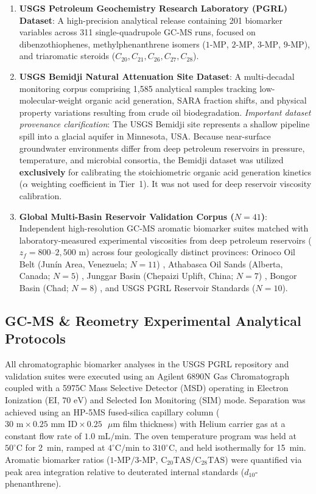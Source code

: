 \documentclass[review,12pt]{elsarticle}
\begin{document}
\begin{enumerate}
    \item \textbf{USGS Petroleum Geochemistry Research Laboratory (PGRL) Dataset}: A high-precision analytical release containing 201 biomarker variables across 311 single-quadrupole GC-MS runs, focused on dibenzothiophenes, methylphenanthrene isomers ($1\text{-MP}$, $2\text{-MP}$, $3\text{-MP}$, $9\text{-MP}$), and triaromatic steroids ($C_{20}, C_{21}, C_{26}, C_{27}, C_{28}$).
    \item \textbf{USGS Bemidji Natural Attenuation Site Dataset}: A multi-decadal monitoring corpus comprising 1,585 analytical samples tracking low-molecular-weight organic acid generation, SARA fraction shifts, and physical property variations resulting from crude oil biodegradation. \emph{Important dataset provenance clarification}: The USGS Bemidji site represents a shallow pipeline spill into a glacial aquifer in Minnesota, USA. Because near-surface groundwater environments differ from deep petroleum reservoirs in pressure, temperature, and microbial consortia, the Bemidji dataset was utilized \textbf{exclusively} for calibrating the stoichiometric organic acid generation kinetics ($\alpha$ weighting coefficient in Tier~1). It was not used for deep reservoir viscosity calibration.
    \item \textbf{Global Multi-Basin Reservoir Validation Corpus ($N=41$)}: Independent high-resolution GC-MS aromatic biomarker suites matched with laboratory-measured experimental viscosities from deep petroleum reservoirs ($z_f = 800\text{--}2{,}500\text{ m}$) across four geologically distinct provinces: Orinoco Oil Belt (Junín Area, Venezuela; $N=11$) \citep{lopez2014biodegradation}, Athabasca Oil Sands (Alberta, Canada; $N=5$) \citep{larter2012molecular}, Junggar Basin (Chepaizi Uplift, China; $N=7$) \citep{chang2022biodegradation}, Bongor Basin (Chad; $N=8$) \citep{mahmoodi2019biodegradation}, and USGS PGRL Reservoir Standards ($N=10$).
\end{enumerate}

\subsection{GC-MS \& Reometry Experimental Analytical Protocols}
All chromatographic biomarker analyses in the USGS PGRL repository and validation suites were executed using an Agilent 6890N Gas Chromatograph coupled with a 5975C Mass Selective Detector (MSD) operating in Electron Ionization (EI, $70\text{ eV}$) and Selected Ion Monitoring (SIM) mode. Separation was achieved using an HP-5MS fused-silica capillary column ($30\text{ m} \times 0.25\text{ mm ID} \times 0.25\text{ }\mu\text{m}$ film thickness) with Helium carrier gas at a constant flow rate of $1.0\text{ mL/min}$. The oven temperature program was held at $50^\circ\text{C}$ for 2~min, ramped at $4^\circ\text{C/min}$ to $310^\circ\text{C}$, and held isothermally for 15~min. Aromatic biomarker ratios ($1\text{-MP}/3\text{-MP}$, $\text{C}_{20}\text{TAS}/\text{C}_{28}\text{TAS}$) were quantified via peak area integration relative to deuterated internal standards ($d_{10}$-phenanthrene).
\end{document}
